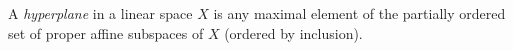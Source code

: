A \emph{hyperplane} in a linear space $X$ is any maximal element of the partially ordered set of proper affine subspaces of $X$ (ordered by inclusion).
